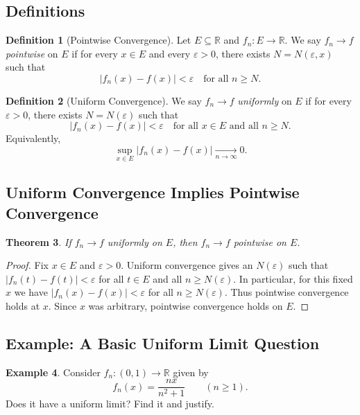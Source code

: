 \documentclass[12pt]{article}
\newtheorem{theorem}{Theorem}[section]
\theoremstyle{definition}
\newtheorem{definition}[theorem]{Definition}
\newtheorem{example}[theorem]{Example}
\begin{document}
\subsection{Definitions}

\begin{definition}[Pointwise Convergence]
Let $E\subseteq \mathbb{R}$ and $f_n:E\to\mathbb{R}$. We say $f_n\to f$ \emph{pointwise} on $E$ if
for every $x\in E$ and every $\varepsilon>0$, there exists $N=N(\varepsilon,x)$ such that
\[
|f_n(x)-f(x)|<\varepsilon\quad\text{for all }n\ge N.
\]
\end{definition}

\begin{definition}[Uniform Convergence]
We say $f_n\to f$ \emph{uniformly} on $E$ if for every $\varepsilon>0$, there exists $N=N(\varepsilon)$ such that
\[
|f_n(x)-f(x)|<\varepsilon\quad\text{for all }x\in E\text{ and all }n\ge N.
\]
Equivalently,
\[
\sup_{x\in E}|f_n(x)-f(x)|\xrightarrow[n\to\infty]{}0.
\]
\end{definition}

\subsection{Uniform Convergence Implies Pointwise Convergence}

\begin{theorem}
If $f_n\to f$ uniformly on $E$, then $f_n\to f$ pointwise on $E$.
\end{theorem}

\begin{proof}
Fix $x\in E$ and $\varepsilon>0$. Uniform convergence gives an $N(\varepsilon)$ such that
$|f_n(t)-f(t)|<\varepsilon$ for all $t\in E$ and all $n\ge N(\varepsilon)$.
In particular, for this fixed $x$ we have $|f_n(x)-f(x)|<\varepsilon$ for all $n\ge N(\varepsilon)$.
Thus pointwise convergence holds at $x$. Since $x$ was arbitrary, pointwise convergence holds on $E$.
\end{proof}

\subsection{Example: A Basic Uniform Limit Question}

\begin{example}
Consider $f_n:(0,1)\to\mathbb{R}$ given by
\[
f_n(x)=\frac{n x}{n^2+1}\qquad(n\ge 1).
\]
Does it have a uniform limit? Find it and justify.
\end{example}
\end{document}
